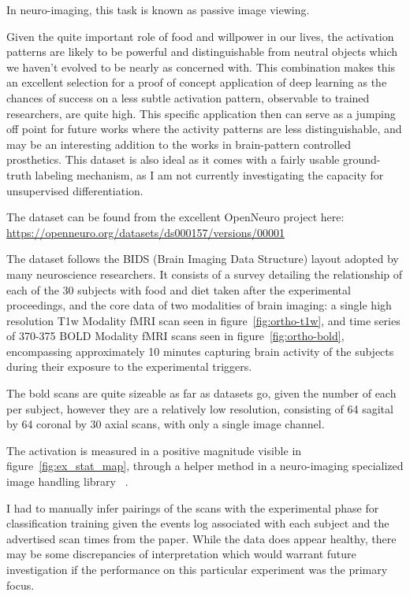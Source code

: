 \documentclass[10pt,twocolumn,letterpaper]{article}
\begin{document}
In neuro-imaging, this task is known as passive image viewing.

Given the quite important role of food and willpower in our lives, the activation patterns are likely to be powerful
and distinguishable from neutral objects which we haven't evolved to be nearly as concerned with.
This combination makes this an excellent selection for a proof of concept application of deep learning as the chances
of success on a less subtle activation pattern, observable to trained researchers, are quite high.
This specific application then can serve as a jumping off point for future works where the activity patterns are less
distinguishable, and may be an interesting addition to the works in brain-pattern controlled prosthetics.
This dataset is also ideal as it comes with a fairly usable ground-truth labeling mechanism, as I am not currently
investigating the capacity for unsupervised differentiation.

The dataset can be found from the excellent
OpenNeuro project here: \url{https://openneuro.org/datasets/ds000157/versions/00001}

The dataset follows the BIDS (Brain Imaging Data Structure) layout adopted by many neuroscience researchers.
It consists of a survey detailing the relationship of each of the 30 subjects with food and diet taken after the experimental
proceedings, and the core data of two modalities of brain imaging: a single high resolution T1w Modality fMRI scan seen in figure~\ref{fig:ortho-t1w},
and time series of 370-375 BOLD Modality fMRI scans seen in figure~\ref{fig:ortho-bold}, encompassing approximately 10 minutes
capturing brain activity of the subjects during their exposure to the experimental triggers.

The bold scans are quite sizeable as far as datasets go, given the number of each per subject,
however they are a relatively low resolution, consisting
of 64 sagital by 64 coronal by 30 axial scans, with only a single image channel.

The activation is measured in a positive magnitude visible in figure~\ref{fig:ex_stat_map}, through a helper method in a neuro-imaging specialized
image handling library ~\cite{brett_matthew_2019_3544468}.

I had to manually infer pairings of the scans with the experimental phase for classification training given the events log associated
with each subject and the advertised scan times from the paper.
While the data does appear healthy, there may be some discrepancies of interpretation which would warrant future investigation if the
performance on this particular experiment was the primary focus.
\end{document}
